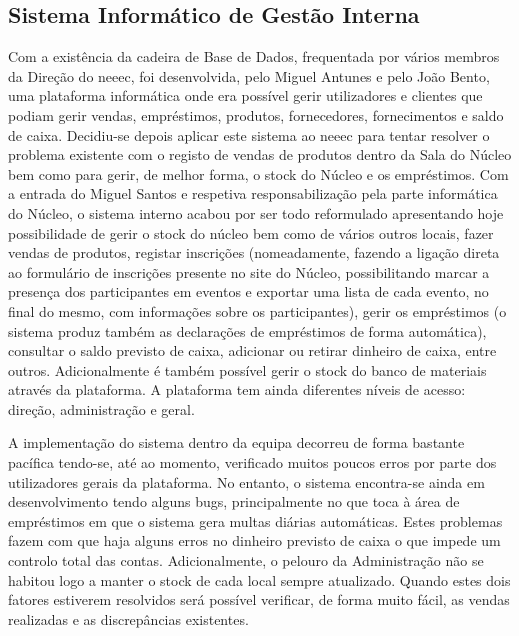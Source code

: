 
\subsection{Sistema Informático de Gestão Interna}

Com a existência da cadeira de Base de Dados, frequentada por vários membros da Direção do \acrshort{neeec}, foi desenvolvida, pelo Miguel Antunes e pelo João Bento, uma plataforma informática onde era possível gerir utilizadores e clientes que podiam gerir vendas, empréstimos, produtos, fornecedores, fornecimentos e saldo de caixa. Decidiu-se depois aplicar este sistema ao \acrshort{neeec} para tentar resolver o problema existente com o registo de vendas de produtos dentro da Sala do Núcleo bem como para gerir, de melhor forma, o stock do Núcleo e os empréstimos. Com a entrada do Miguel Santos e respetiva responsabilização pela parte informática do Núcleo, o sistema interno acabou por ser todo reformulado apresentando hoje possibilidade de gerir o stock do núcleo bem como de vários outros locais, fazer vendas de produtos, registar inscrições (nomeadamente, fazendo a ligação direta ao formulário de inscrições presente no site do Núcleo, possibilitando marcar a presença dos participantes em eventos e exportar uma lista de cada evento, no final do mesmo, com informações sobre os participantes), gerir os empréstimos (o sistema produz também as declarações de empréstimos de forma automática), consultar o saldo previsto de caixa, adicionar ou retirar dinheiro de caixa, entre outros. Adicionalmente é também possível gerir o stock do banco de materiais através da plataforma. A plataforma tem ainda diferentes níveis de acesso: direção, administração e geral.

A implementação do sistema dentro da equipa decorreu de forma bastante pacífica tendo-se, até ao momento, verificado muitos poucos erros por parte dos utilizadores gerais da plataforma. No entanto, o sistema encontra-se ainda em desenvolvimento tendo alguns bugs, principalmente no que toca à área de empréstimos em que o sistema gera multas diárias automáticas. Estes problemas fazem com que haja alguns erros no dinheiro previsto de caixa o que impede um controlo total das contas. Adicionalmente, o pelouro da Administração não se habitou logo a manter o stock de cada local sempre atualizado. Quando estes dois fatores estiverem resolvidos será possível verificar, de forma muito fácil, as vendas realizadas e as discrepâncias existentes.

